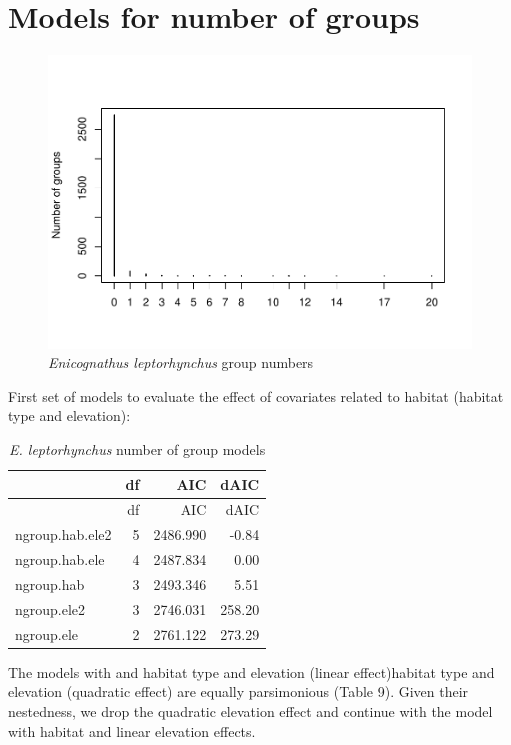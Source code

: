 \documentclass[]{article}
\begin{document}
\section{Models for number of
groups}\label{models-for-number-of-groups-1}

\begin{figure}[H]
\includegraphics{Patagonia_parrots_density_analysis_files/figure-latex/unnamed-chunk-20-1} \caption{\textit{Enicognathus leptorhynchus} group numbers }\label{fig:unnamed-chunk-20}
\end{figure}

First set of models to evaluate the effect of covariates related to
habitat (habitat type and elevation):

\begin{longtable}[]{@{}lrrr@{}}
\caption{\textit{E. leptorhynchus} number of group
models}\tabularnewline
\toprule
& df & AIC & dAIC\tabularnewline
\midrule
\endfirsthead
\toprule
& df & AIC & dAIC\tabularnewline
\midrule
\endhead
ngroup.hab.ele2 & 5 & 2486.990 & -0.84\tabularnewline
ngroup.hab.ele & 4 & 2487.834 & 0.00\tabularnewline
ngroup.hab & 3 & 2493.346 & 5.51\tabularnewline
ngroup.ele2 & 3 & 2746.031 & 258.20\tabularnewline
ngroup.ele & 2 & 2761.122 & 273.29\tabularnewline
\bottomrule
\end{longtable}

The models with and habitat type and elevation (linear effect)habitat
type and elevation (quadratic effect) are equally parsimonious (Table
9). Given their nestedness, we drop the quadratic elevation effect and
continue with the model with habitat and linear elevation effects.
\end{document}
